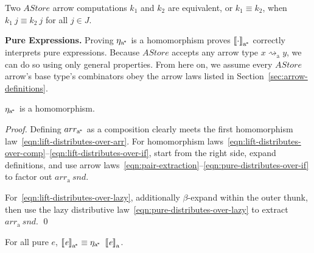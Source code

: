 \documentclass{llncs}
\renewcommand{\paragraph}[1]{\vspace{0.5\baselineskip}\noindent\textbf{{#1}.}\hspace{0.25\baselineskip}}
\newcommand{\arrow}{\rightsquigarrow}
\newcommand{\arrowarr}{\ensuremath{arr}}
\newcommand{\arrowtrans}{\ensuremath{\eta}}
\newcommand{\gen}{_\mathrm{a}}
\newcommand{\genc}{_\mathrm{a^{\mspace{-2mu}*}}}
\begin{document}
\begin{definition}
Two $AStore$ arrow computations $k_1$ and $k_2$ are equivalent, or $k_1 \equiv k_2$, when $k_1~j \equiv k_2~j$ for all $j \in J$.
\end{definition}

\paragraph{Pure Expressions}
Proving $\arrowtrans\genc$ is a homomorphism proves $\meaningof{\cdot}\genc$ correctly interprets pure expressions.
Because $AStore$ accepts any arrow type $x \arrow\gen y$, we can do so using only general properties.
From here on, we assume every $AStore$ arrow's base type's combinators obey the arrow laws listed in Section~\ref{sec:arrow-definitions}.

\begin{theorem}
$\arrowtrans\genc$ is a homomorphism.
\end{theorem}
\begin{proof}
Defining $\arrowarr\genc$ as a composition clearly meets the first homomorphism law~\eqref{eqn:lift-distributes-over-arr}.
For homomorphism laws~\eqref{eqn:lift-distributes-over-comp}--\eqref{eqn:lift-distributes-over-if}, start from the right side, expand definitions, and use arrow laws~\eqref{eqn:pair-extraction}--\eqref{eqn:pure-distributes-over-if} to factor out $\arrowarr\gen~snd$.

For~\eqref{eqn:lift-distributes-over-lazy}, additionally $\beta$-expand within the outer thunk, then use the lazy distributive law~\eqref{eqn:pure-distributes-over-lazy} to extract $\arrowarr\gen~snd$.
\qed
\end{proof}

\begin{corollary}
\label{cor:pure-astore-semantic-correctness}
For all pure $\mathit{e}$, $\meaningof{\mathit{e}}\genc \equiv \arrowtrans\genc~\meaningof{\mathit{e}}\gen$.
\end{corollary}
\end{document}
